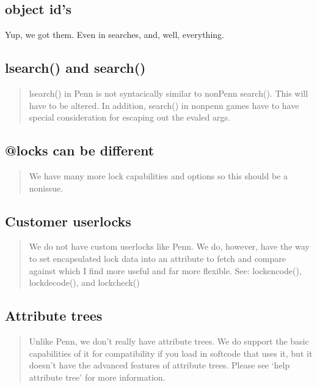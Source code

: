 \documentclass[letterpaper,10pt,english]{sphinxmanual}
\begin{document}
\subsection{object id’s}
\label{\detokenize{differences:object-id-s}}
\sphinxAtStartPar
Yup, we got them.  Even in searches, and, well, everything.


\subsection{lsearch() and search()}
\label{\detokenize{differences:lsearch-and-search}}\begin{quote}

\sphinxAtStartPar
lsearch() in Penn is not syntacically similar to non\sphinxhyphen{}Penn search().
This will have to be altered.  In addition, search() in non\sphinxhyphen{}penn games
have to have special consideration for escaping out the evaled args.
\end{quote}


\subsection{@locks can be different}
\label{\detokenize{differences:locks-can-be-different}}\begin{quote}

\sphinxAtStartPar
We have many more lock capabilities and options
so this should be a non\sphinxhyphen{}issue.
\end{quote}


\subsection{Customer user\sphinxhyphen{}locks}
\label{\detokenize{differences:customer-user-locks}}\begin{quote}

\sphinxAtStartPar
We do not have custom user\sphinxhyphen{}locks like Penn.  We do, however, have the way
to set encapsulated lock data into an attribute to fetch and compare
against which I find more useful and far more flexible.
See: lockencode(), lockdecode(), and lockcheck()
\end{quote}


\subsection{Attribute trees}
\label{\detokenize{differences:attribute-trees}}\begin{quote}

\sphinxAtStartPar
Unlike Penn, we don’t really have attribute trees.  We do support the
basic capabilities of it for compatibility if you load in softcode that
uses it, but it doesn’t have the advanced features of attribute trees.
Please see ‘help attribute tree’ for more information.
\end{quote}
\end{document}
